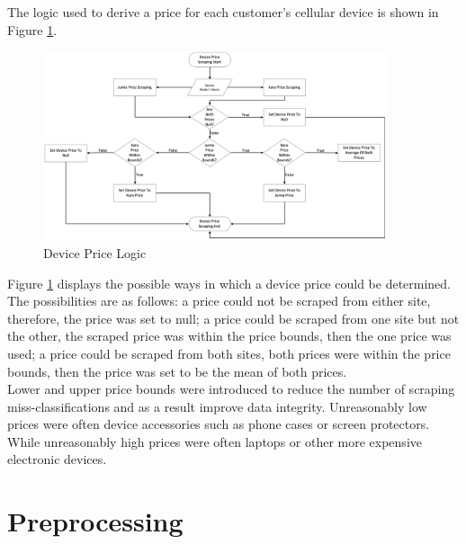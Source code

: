 The logic used to derive a price for each customer's cellular device is shown in Figure \ref{fig:device}.

\vspace{10pt}

\begin{figure}[!htb]
\centering
\includegraphics[width=0.9\textwidth]{images/device_price.png}
\caption{Device Price Logic}
\label{fig:device}
\end{figure}

\vspace{10pt}


Figure \ref{fig:device} displays the possible ways in which a device price could be determined. The possibilities are as follows: a price could not be scraped from either site, therefore, the price was set to null; a price could be scraped from one site but not the other, the scraped price was within the price bounds, then the one price was used; a price could be scraped from both sites, both prices were within the price bounds, then the price was set to be the mean of both prices. \\

Lower and upper price bounds were introduced to reduce the number of scraping miss-classifications and as a result improve data integrity. Unreasonably low prices were often device accessories such as phone cases or screen protectors. While unreasonably high prices were often laptops or other more expensive electronic devices.


\section{Preprocessing}

